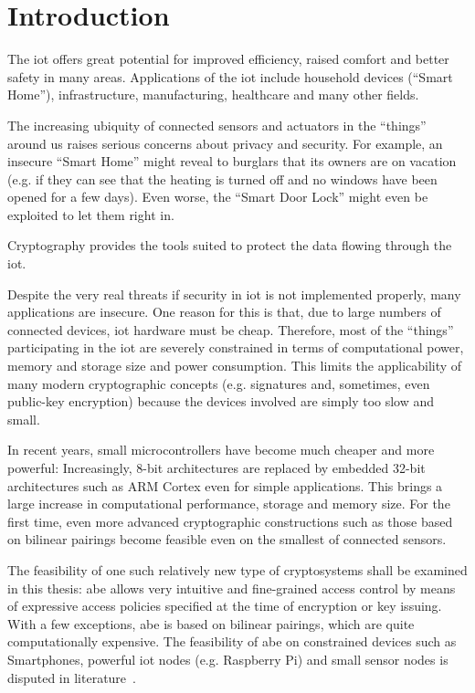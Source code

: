 
\chapter{Introduction}\label{chapter:introduction}

The \acrfull{iot} offers great potential for improved efficiency, raised comfort and better safety in many areas. %
Applications of the \acrshort{iot} include household devices (``Smart Home''), infrastructure, manufacturing, healthcare and many other fields.

The increasing ubiquity of connected sensors and actuators in the ``things'' around us raises serious concerns about privacy and security.
For example, an insecure ``Smart Home'' might reveal to burglars that its owners are on vacation (e.g. if they can see that the heating is turned off and no windows have been opened for a few days).
Even worse, the ``Smart Door Lock'' might even be exploited to let them right in.

Cryptography provides the tools suited to protect the data flowing through the \acrshort{iot}.

Despite the very real threats if security in \acrshort{iot} is not implemented properly, many applications are insecure. 
One reason for this is that, due to large numbers of connected devices, \acrshort{iot} hardware must be cheap.
Therefore, most of the ``things'' participating in the \acrshort{iot} are severely constrained in terms of computational power, memory and storage size and power consumption. 
This limits the applicability of many modern cryptographic concepts (e.g. signatures and, sometimes, even public-key encryption) because the devices involved are simply too slow and small.

In recent years, small microcontrollers have become much cheaper and more powerful: 
Increasingly, 8-bit architectures are replaced by embedded 32-bit architectures such as ARM Cortex even for simple applications. %
This brings a large increase in computational performance, storage and memory size.
For the first time, even more advanced cryptographic constructions such as those based on bilinear pairings become feasible even on the smallest of connected sensors.

The feasibility of one such relatively new type of cryptosystems shall be examined in this thesis: 
\acrfull{abe} allows very intuitive and fine-grained access control by means of expressive access policies specified at the time of encryption or key issuing.
With a few exceptions, \acrshort{abe} is based on bilinear pairings, which are quite computationally expensive.
The feasibility of \acrshort{abe} on constrained devices such as Smartphones, powerful \acrshort{iot} nodes (e.g. Raspberry Pi) and small sensor nodes is disputed in literature~\cite{wang_performance_2014,ambrosin_feasibility_2016,ambrosin_feasibility_2015,girgenti_feasibility_2019,borgh_attribute-based_2016}.


